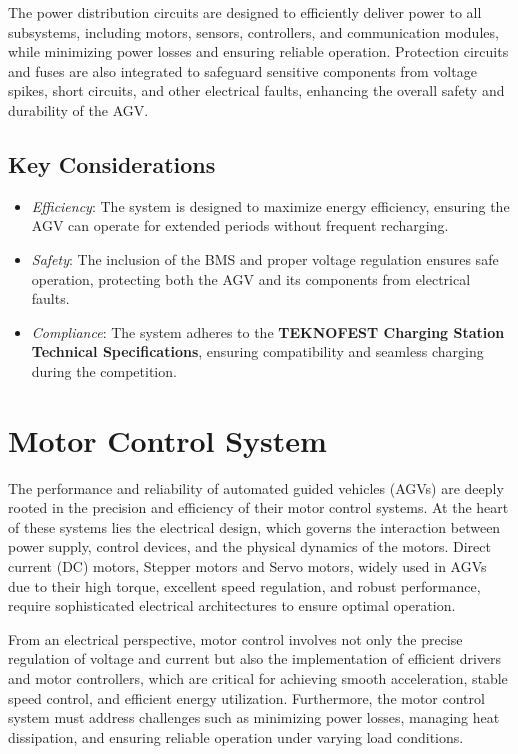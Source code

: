 \documentclass[../../main]{subfiles}
\begin{document}
The power distribution circuits are designed to efficiently deliver power to all 
subsystems, including motors, sensors, controllers, and communication 
modules, while minimizing power losses and ensuring reliable operation. 
Protection circuits and fuses are also integrated to safeguard sensitive 
components from voltage spikes, short circuits, and other electrical faults, 
enhancing the overall safety and durability of the AGV.

\subsection{Key Considerations}%
\begin{itemize}
    \item \textit{Efficiency}: The system is designed to maximize 
    energy efficiency, ensuring the AGV can operate for extended 
    periods without frequent recharging.
    \item \textit{Safety}: The inclusion of the BMS and proper voltage 
    regulation ensures safe operation, protecting both the AGV and its 
    components from electrical faults.
    \item \textit{Compliance}: The system adheres to the \textbf{TEKNOFEST 
    Charging Station Technical Specifications}, ensuring compatibility 
    and seamless charging during the competition.
\end{itemize}


\section{Motor Control System}

The performance and reliability of automated guided vehicles (AGVs) are deeply rooted in the precision and efficiency of
their motor control systems\cite{cservenak2018further}. At the heart of these systems lies the electrical design, which governs the interaction 
between power supply, control devices, and the physical dynamics of the motors. Direct current (DC) motors\cite{OrientalMotorAGV}, Stepper motors\cite{LinEngineering_AGV} and Servo motors\cite{AMC_AGV_Benefits}, widely 
used in AGVs due to their high torque, excellent speed regulation, and robust performance, require sophisticated electrical 
architectures to ensure optimal operation. 

From an electrical perspective, motor control involves not only the precise regulation of voltage and current but 
also the implementation of efficient drivers and motor controllers, which are critical for achieving smooth acceleration, 
stable speed control, and efficient energy utilization. Furthermore, the motor control system must address challenges 
such as minimizing power losses, managing heat dissipation, and ensuring reliable operation under varying load conditions. 
\end{document}
